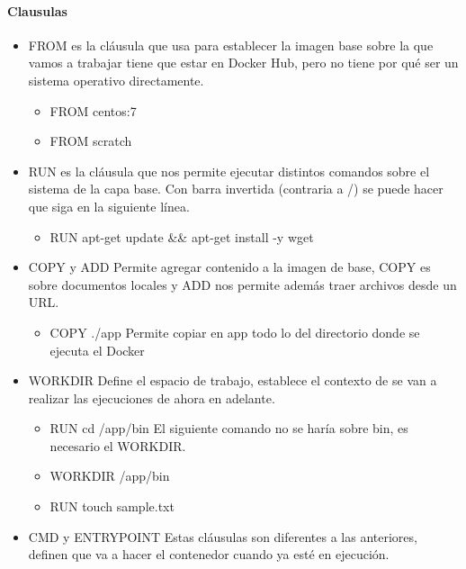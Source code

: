 \documentclass[12pt, twoside, openright]{report} %
\begin{document}
\paragraph{Clausulas}
\begin{itemize}
	\item FROM es la cláusula que usa para establecer la imagen base sobre la que vamos a trabajar tiene que estar en Docker Hub, pero no tiene por qué ser un sistema operativo directamente.
	      \begin{itemize}
		      \item FROM centos:7
		      \item FROM scratch
	      \end{itemize}
	\item RUN es la cláusula que nos permite ejecutar distintos comandos sobre el sistema de la capa base. Con barra invertida (contraria a /) se puede hacer que siga en la siguiente línea.
	      \begin{itemize}
		      \item RUN apt-get update \&\& apt-get install -y wget
	      \end{itemize}
	\item COPY y ADD Permite agregar contenido a la imagen de base, COPY es sobre documentos locales y ADD nos permite además traer archivos desde un URL.
	      \begin{itemize}
		      \item COPY ./app Permite copiar en app todo lo del directorio donde se ejecuta el Docker
	      \end{itemize}
	\item WORKDIR Define el espacio de trabajo, establece el contexto de se van a realizar las ejecuciones de ahora en adelante.
	      \begin{itemize}
		      \item RUN cd /app/bin   El siguiente comando no se haría sobre bin, es necesario el WORKDIR.
		      \item WORKDIR /app/bin
		      \item RUN touch sample.txt
	      \end{itemize}
	\item CMD y ENTRYPOINT Estas cláusulas son diferentes a las anteriores, definen que va a hacer el contenedor cuando ya esté en ejecución.


\end{itemize}
\end{document}

